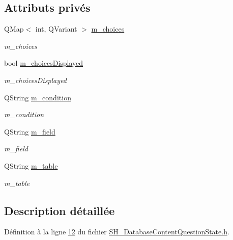 \subsection*{Attributs privés}
\begin{DoxyCompactItemize}
\item 
Q\-Map$<$ int, Q\-Variant $>$ \hyperlink{classSimpleHotel_1_1SH__DatabaseContentQuestionState_ac0e291d1e20d22aabc6887032e516203}{m\-\_\-choices}
\begin{DoxyCompactList}\small\item\em m\-\_\-choices \end{DoxyCompactList}\item 
bool \hyperlink{classSimpleHotel_1_1SH__DatabaseContentQuestionState_acb045bff3966840e9266b39430f38144}{m\-\_\-choices\-Displayed}
\begin{DoxyCompactList}\small\item\em m\-\_\-choices\-Displayed \end{DoxyCompactList}\item 
Q\-String \hyperlink{classSimpleHotel_1_1SH__DatabaseContentQuestionState_af58df736e856e78ef4689714a75b756c}{m\-\_\-condition}
\begin{DoxyCompactList}\small\item\em m\-\_\-condition \end{DoxyCompactList}\item 
Q\-String \hyperlink{classSimpleHotel_1_1SH__DatabaseContentQuestionState_ac586a187aa54eb8cc3227688b120d083}{m\-\_\-field}
\begin{DoxyCompactList}\small\item\em m\-\_\-field \end{DoxyCompactList}\item 
Q\-String \hyperlink{classSimpleHotel_1_1SH__DatabaseContentQuestionState_a1cfd629c5c5abe1f349d31861951d8c3}{m\-\_\-table}
\begin{DoxyCompactList}\small\item\em m\-\_\-table \end{DoxyCompactList}\end{DoxyCompactItemize}


\subsection{Description détaillée}


Définition à la ligne \hyperlink{SH__DatabaseContentQuestionState_8h_source_l00012}{12} du fichier \hyperlink{SH__DatabaseContentQuestionState_8h_source}{S\-H\-\_\-\-Database\-Content\-Question\-State.\-h}.



